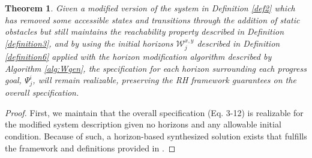 \documentclass[journal]{IEEEtran}
\newtheorem{theorem}{Theorem}
\begin{document}
\begin{theorem}
	Given a modified version of the system in Definition \ref{def2} which has removed some accessible states and transitions through the addition of static obstacles but still maintains the \textit{reachability} property described in Definition \ref{definition3}, and by using the initial horizons $\mathcal{W}^{x,y}_j$ described in Definition \ref{definition6} applied with the horizon modification algorithm described by Algorithm \ref{alg:Wgen}, the specification for each horizon surrounding each progress goal, $\Psi_{j}^{i}$, will remain realizable, preserving the RH framework guarantees on the overall specification.
\end{theorem}

\begin{proof}
First, we maintain that the overall specification (Eq. 3-12) is realizable for the modified system description given no horizons and any allowable initial condition. Because of such, a horizon-based synthesized solution exists that fulfills the framework and definitions provided in \cite{c10}. 




\end{proof}
\end{document}
